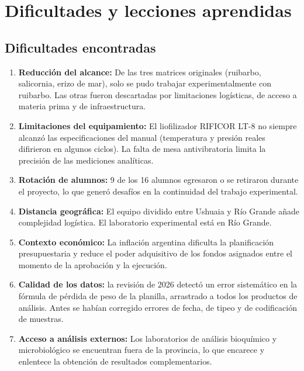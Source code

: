 \documentclass[12pt, a4paper]{article}
\newcommand{\porconf}[1]{\textcolor{orange!85!black}{#1}}
\begin{document}
\section{Dificultades y lecciones aprendidas}

\subsection{Dificultades encontradas}

\begin{enumerate}[nosep]
    \item \textbf{Reducción del alcance:} De las tres matrices originales (ruibarbo, salicornia, erizo de mar), solo se pudo trabajar experimentalmente con ruibarbo. Las otras fueron descartadas por limitaciones logísticas, de acceso a materia prima y de infraestructura.

    \item \textbf{Limitaciones del equipamiento:} El liofilizador RIFICOR LT-8 no siempre alcanzó las especificaciones del manual (temperatura y presión reales difirieron en algunos ciclos). La falta de mesa antivibratoria limita la precisión de las mediciones analíticas.

    \item \textbf{Rotación de alumnos:} \porconf{9 de los 16} alumnos egresaron o se retiraron durante el proyecto, lo que generó desafíos en la continuidad del trabajo experimental.

    \item \textbf{Distancia geográfica:} El equipo dividido entre Ushuaia y Río Grande añade complejidad logística. El laboratorio experimental está en Río Grande.

    \item \textbf{Contexto económico:} La inflación argentina dificulta la planificación presupuestaria y reduce el poder adquisitivo de los fondos asignados entre el momento de la aprobación y la ejecución.

    \item \textbf{Calidad de los datos:} la revisión de 2026 detectó un error sistemático en la fórmula de pérdida de peso de la planilla, arrastrado a todos los productos de análisis. Antes se habían corregido errores de fecha, de tipeo y de codificación de muestras.

    \item \textbf{Acceso a análisis externos:} Los laboratorios de análisis bioquímico y microbiológico se encuentran fuera de la provincia, lo que encarece y enlentece la obtención de resultados complementarios.
\end{enumerate}
\end{document}
